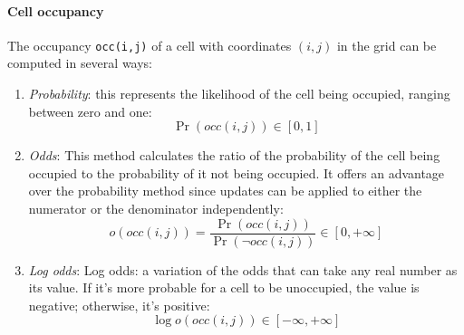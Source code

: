\paragraph*{Cell occupancy}
The occupancy \texttt{occ(i,j)} of a cell with coordinates $(i,j)$ in the grid can be computed in several ways:
\begin{enumerate}
    \item \textit{Probability}: this represents the likelihood of the cell being occupied, ranging between zero and one:
        \[\Pr\left(occ\left(i,j\right)\right)\in\left[0,1\right]\]
    \item \textit{Odds}: This method calculates the ratio of the probability of the cell being occupied to the probability of it not being occupied. 
        It offers an advantage over the probability method since updates can be applied to either the numerator or the denominator independently:
        \[o(occ(i,j))=\dfrac{\Pr\left(occ\left(i,j\right)\right)}{\Pr\left(\lnot occ\left(i,j\right)\right)}\in\left[0,+\infty\right]\]
    \item \textit{Log odds}: Log odds: a variation of the odds that can take any real number as its value. 
        If it's more probable for a cell to be unoccupied, the value is negative; otherwise, it's positive:
        \[\log o(occ(i,j))\in\left[-\infty,+\infty\right]\]
\end{enumerate}